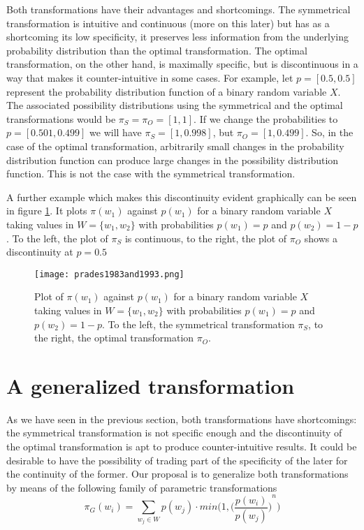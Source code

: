 \documentclass[a4paper]{article}
\begin{document}
Both transformations have their advantages and shortcomings. The symmetrical transformation is intuitive and continuous (more on this later) but has as a shortcoming its low specificity, it preserves less information from the underlying probability distribution than the optimal transformation. The optimal transformation, on the other hand, is maximally specific, but is discontinuous in a way that makes it counter-intuitive in some cases. For example, let $p=[0.5,0.5]$ represent the probability distribution function of a binary random variable $X$. The associated possibility distributions using the symmetrical and the optimal transformations would be $\pi_S = \pi_O= [1,1]$. If we change the probabilities to $p=[0.501,0.499]$  we will have $\pi_S=[1,0.998]$, but $\pi_O=[1,0.499]$. So, in the case of the optimal transformation, arbitrarily small changes in the probability distribution function can produce large changes in the possibility distribution function. This is not the case with the symmetrical transformation.

A further example which makes this discontinuity evident graphically can be seen in figure \ref{fig:pradestransformations}. It plots $\pi(w_1)$ against $p(w_1)$ for a binary random variable $X$ taking values in $W=\{w_1,w_2\}$ with probabilities $p(w_1)=p$ and $p(w_2)=1-p$. To the left, the plot of $\pi_S$ is continuous, to the right, the plot of $\pi_O$ shows a discontinuity at $p=0.5$
\begin{figure}
\centering
\texttt{[image: prades1983and1993.png]}
\caption{\label{fig:pradestransformations}Plot of $\pi(w_1)$ against $p(w_1)$ for a binary random variable $X$ taking values in $W=\{w_1,w_2\}$ with probabilities $p(w_1)=p$ and $p(w_2)=1-p$. To the left, the symmetrical transformation $\pi_S$, to the right, the optimal transformation $\pi_O$.}
\end{figure}

\section{A generalized transformation}
As we have seen in the previous section, both transformations have shortcomings: the symmetrical transformation is not specific enough and the discontinuity of the optimal transformation  is apt to produce counter-intuitive results. It could be desirable to have the possibility of trading part of the specificity of the later for the continuity of the former. Our proposal is to generalize both transformations by means of the following family of parametric transformations
\begin{equation} \label{eq:generalized}
\pi_G(w_i)= \sum_{w_j \in W}p(w_j) \cdot min \bigg(1,{\Big({\frac{p(w_i)}{p(w_j)}\Big)}^n\bigg)} 
\end{equation}
\end{document}
